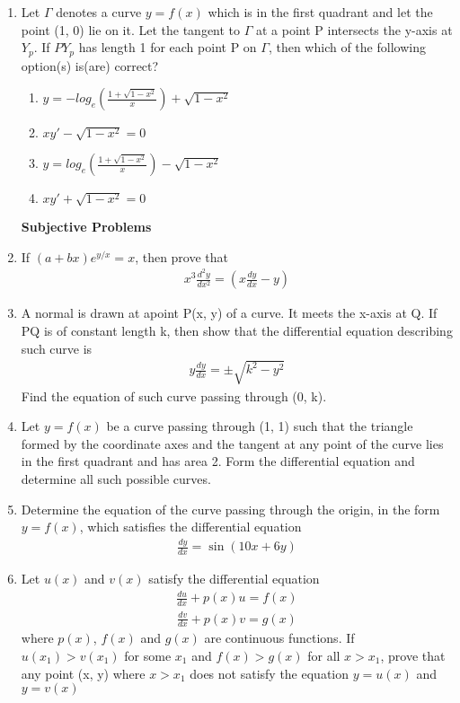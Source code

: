 \begin{enumerate}[label=\arabic*.,ref=\thesubsection.\theenumi]
\item Let $\Gamma$ denotes a curve $y = f(x)$ which is in the first quadrant and let the point (1, 0) lie on it. Let the tangent to $\Gamma$ at a point P intersects the y-axis at $Y_p$. If $PY_p$ has length 1 for each point P on $\Gamma$, then which of the following option(s) is(are) correct?
\begin{enumerate}
\item $y = -log_e\left(\frac{1 + \sqrt{1 - x^2}}{x}\right) + \sqrt{1 - x^2}$
\item $xy' - \sqrt{1 - x^2} = 0$
\item $y = log_e\left(\frac{1 + \sqrt{1 - x^2}}{x}\right) - \sqrt{1 - x^2}$
\item $xy' + \sqrt{1 - x^2} = 0$
\end{enumerate} 

\textbf{Subjective Problems}

\item If $(a + bx)e^{y/x} = x$, then prove that
\begin{align*}
x^3\frac{d^{2}y}{dx^{2}} = \left(x\frac{dy}{dx} - y\right)
\end{align*}

\item A normal is drawn at apoint P(x, y) of a curve. It meets the x-axis at Q. If PQ is of constant length k, then show that the differential equation describing such curve is
\begin{align*}
y \frac{dy}{dx} = \pm \sqrt{k^2 - y^2}
\end{align*}
Find the equation of such curve passing through (0, k).

\item Let $y = f(x)$ be a curve passing through (1, 1) such that the triangle formed by the coordinate axes and the tangent at any point of the curve lies in the first quadrant and has area 2. Form the differential equation and determine all such possible curves.

\item Determine the equation of the curve passing through the origin, in the form $y = f(x)$, which satisfies the differential equation
\begin{align*}
\frac{dy}{dx} = \sin(10x+ 6y)
\end{align*}

\item Let $u(x)$ and $v(x)$ satisfy the differential equation
\begin{align*}
\frac{du}{dx} + p(x)u = f(x)
\end{align*}
\begin{align*}
\frac{dv}{dx} + p(x)v = g(x)
\end{align*}
where $p(x)$, $f(x)$ and $g(x)$ are continuous functions. If $u(x_1) > v(x_1)$ for some $x_1$ and $f(x) > g(x)$ for all $x > x_1$, prove that any point (x, y) where $x > x_1$ does not satisfy the equation $y = u(x)$ and $y = v(x)$ 



\end{enumerate}
